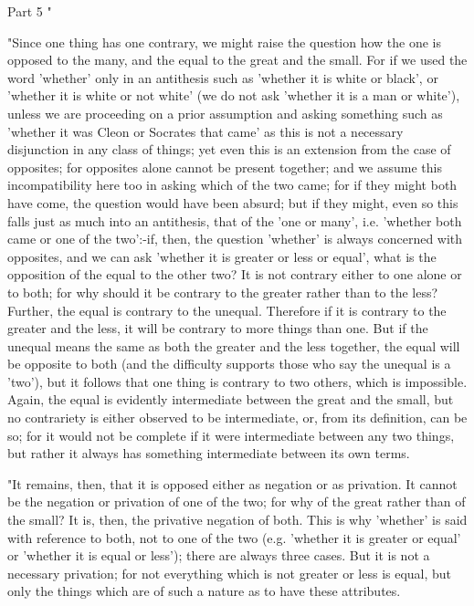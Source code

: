 Part 5 "

"Since one thing has one contrary, we might raise the question how
the one is opposed to the many, and the equal to the great and the
small. For if we used the word 'whether' only in an antithesis such
as 'whether it is white or black', or 'whether it is white or not
white' (we do not ask 'whether it is a man or white'), unless we are
proceeding on a prior assumption and asking something such as 'whether
it was Cleon or Socrates that came' as this is not a necessary disjunction
in any class of things; yet even this is an extension from the case
of opposites; for opposites alone cannot be present together; and
we assume this incompatibility here too in asking which of the two
came; for if they might both have come, the question would have been
absurd; but if they might, even so this falls just as much into an
antithesis, that of the 'one or many', i.e. 'whether both came or
one of the two':-if, then, the question 'whether' is always concerned
with opposites, and we can ask 'whether it is greater or less or equal',
what is the opposition of the equal to the other two? It is not contrary
either to one alone or to both; for why should it be contrary to the
greater rather than to the less? Further, the equal is contrary to
the unequal. Therefore if it is contrary to the greater and the less,
it will be contrary to more things than one. But if the unequal means
the same as both the greater and the less together, the equal will
be opposite to both (and the difficulty supports those who say the
unequal is a 'two'), but it follows that one thing is contrary to
two others, which is impossible. Again, the equal is evidently intermediate
between the great and the small, but no contrariety is either observed
to be intermediate, or, from its definition, can be so; for it would
not be complete if it were intermediate between any two things, but
rather it always has something intermediate between its own terms.

"It remains, then, that it is opposed either as negation or as privation.
It cannot be the negation or privation of one of the two; for why
of the great rather than of the small? It is, then, the privative
negation of both. This is why 'whether' is said with reference to
both, not to one of the two (e.g. 'whether it is greater or equal'
or 'whether it is equal or less'); there are always three cases. But
it is not a necessary privation; for not everything which is not greater
or less is equal, but only the things which are of such a nature as
to have these attributes. 


